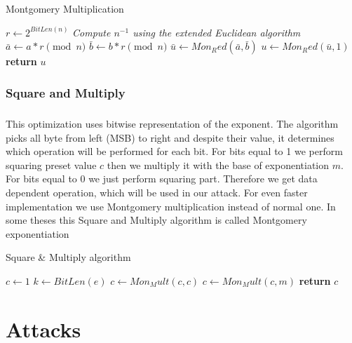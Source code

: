 \documentclass[thesis=B,english]{FITthesis}[2012/10/20]
\begin{document}
{\begin{algorithm}[H]
\caption{Montgomery Multiplication}
\begin{algorithmic}[1]
 \State $r \gets 2^{BitLen(n)}$
 \State \textit{Compute \(n^{-1}\) using the extended Euclidean algorithm}
 \State $\bar{a} \gets a *r \pmod{n}$
 \State $\bar{b} \gets b * r \pmod{n}$
 \State $\bar{u} \gets Mon_Red(\bar{a}, \bar{b})$
 \State $u \gets Mon_Red(\bar{u}, 1)$
 \State \textbf{return} $u$
\EndFunction
\end{algorithmic}
\end{algorithm}


\subsection{Square and Multiply}
\paragraph*{}
{This optimization uses bitwise representation of the exponent. The algorithm picks all byte from left (MSB) to right and despite their value, 
it determines which operation will be performed for each bit. For bits equal to 1 we perform squaring preset value \(c\) then we multiply it with the base of exponentiation \(m\). 
For bits equal to 0 we just perform squaring part. Therefore we get data dependent operation, which will be used in our attack. For even faster implementation we use Montgomery
multiplication instead of normal one. In some theses this Square and Multiply algorithm is called Montgomery exponentiation}



\begin{algorithm}[H]
\caption{Square \& Multiply algorithm}
\begin{algorithmic}[1]
 \State $c\gets 1$
 \State $k\gets BitLen(e)$
  \State $c \gets Mon_Mult(c,c)$
   \State $c \gets Mon_Mult(c,m)$
  \EndIf
 \EndFor
\State \textbf{return} $c$
\EndFunction
 
\end{algorithmic}
\end{algorithm}



\chapter{Attacks}
}
\end{document}
